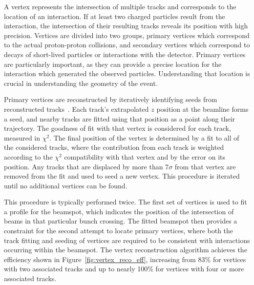 A vertex represents the intersection of multiple tracks and corresponds to the location of an interaction.
If at least two charged particles result from the interaction, the intersection of their resulting tracks reveals its position with high precision.
Vertices are divided into two groups, primary vertices which correspond to the actual proton-proton collisions, and secondary vertices which correspond to decays of short-lived particles or interactions with the detector. 
Primary vertices are particularly important, as they can provide a precise location for the interaction which generated the observed particles.
Understanding that location is crucial in understanding the geometry of the event.

Primary vertices are reconstructed by iteratively identifying seeds from reconstructed tracks~\cite{ATLAS-CONF-2010-069}.
Each track's extrapolated $z$ position at the beamline forms a seed, and nearby tracks are fitted using that position as a point along their trajectory.
The goodness of fit with that vertex is considered for each track, measured in $\chi^2$. 
The final position of the vertex is determined by a fit to all of the considered tracks, where the contribution from each track is weighted according to the $\chi^2$ compatibility with that vertex and by the error on its position.
Any tracks that are displaced by more than 7$\sigma$ from that vertex are removed from the fit and used to seed a new vertex.
This procedure is iterated until no additional vertices can be found.

This procedure is typically performed twice.
The first set of vertices is used to fit a profile for the beamspot, which indicates the position of the intersection of beams in that particular bunch crossing.
The fitted beamspot then provides a constraint for the second attempt to locate primary vertices, where both the track fitting and seeding of vertices are required to be consistent with interactions occurring within the beamspot.
The vertex reconstruction algorithm achieves the efficiency shown in Figure~\ref{fig:vertex_reco_eff}, increasing from 83\% for vertices with two associated tracks and up to nearly 100\% for vertices with four or more associated tracks.

